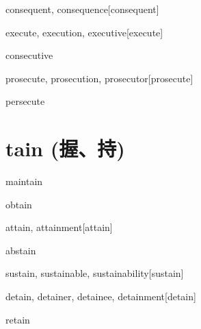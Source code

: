 \begin{RefWord}{consequent, consequence}[consequent]
\end{RefWord}

\begin{RefWord}{execute, execution, executive}[execute]
\end{RefWord}

\begin{RefWord}{consecutive}
\end{RefWord}

\begin{RefWord}{prosecute, prosecution, prosecutor}[prosecute]
\end{RefWord}

\begin{RefWord}{persecute}
\end{RefWord}

\section{tain (握、持)}

\begin{RefWord}{maintain}
\end{RefWord}

\begin{RefWord}{obtain}
\end{RefWord}

\begin{RefWord}{attain, attainment}[attain]
\end{RefWord}

\begin{RefWord}{abstain}
\end{RefWord}

\begin{RefWord}{sustain, sustainable, sustainability}[sustain]
\end{RefWord}

\begin{RefWord}{detain, detainer, detainee, detainment}[detain]
\end{RefWord}

\begin{RefWord}{retain}
\end{RefWord}